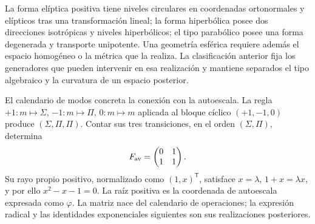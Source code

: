 La forma elíptica positiva tiene niveles circulares en coordenadas
ortonormales y elípticos tras una transformación lineal; la forma hiperbólica
posee dos direcciones isotrópicas y niveles hiperbólicos; el tipo parabólico
posee una forma degenerada y transporte unipotente. Una geometría esférica
requiere además el espacio homogéneo o la métrica que la realiza. La
clasificación anterior fija los generadores que pueden intervenir en esa
realización y mantiene separados el tipo algebraico y la curvatura de un
espacio posterior.

El calendario de modos concreta la conexión con la autoescala. La regla
\(+1:m\mapsto\Sigma\), \(-1:m\mapsto\Pi\), \(0:m\mapsto m\)
aplicada al bloque cíclico \((+1,-1,0)\) produce
\((\Sigma,\Pi,\Pi)\). Contar sus tres transiciones, en el orden
\((\Sigma,\Pi)\), determina
\begin{equation}
 F_{\rm av}=\begin{pmatrix}0&1\\1&1\end{pmatrix}.
 \label{eq:geo-fav}
\end{equation}
Su rayo propio positivo, normalizado como \((1,x)^\mathsf T\), satisface
\(x=\lambda\), \(1+x=\lambda x\), y por ello
\(x^2-x-1=0\). La raíz positiva es la coordenada de autoescala expresada
como \(\varphi\). La matriz nace del calendario de operaciones; la
expresión radical y las identidades exponenciales siguientes son sus
realizaciones posteriores.



